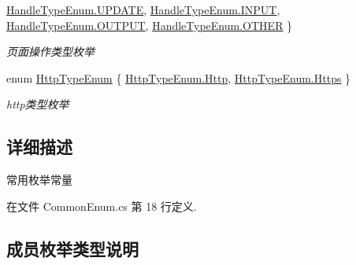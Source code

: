 \begin{DoxyCompactItemize}
\hyperlink{class_x_c_l_net_tools_1_1_enum_1_1_common_enum_af5501e481d93b082864bdcfb5fdb9596a15a8022d0ed9cd9c2a2e756822703eb4}{Handle\+Type\+Enum.\+U\+P\+D\+A\+TE}, 
\hyperlink{class_x_c_l_net_tools_1_1_enum_1_1_common_enum_af5501e481d93b082864bdcfb5fdb9596aa84cc046d48610b05c21fd3670d0c829}{Handle\+Type\+Enum.\+I\+N\+P\+UT}, 
\newline
\hyperlink{class_x_c_l_net_tools_1_1_enum_1_1_common_enum_af5501e481d93b082864bdcfb5fdb9596a50a87f0d71f7221582dad4bf507a0f34}{Handle\+Type\+Enum.\+O\+U\+T\+P\+UT}, 
\hyperlink{class_x_c_l_net_tools_1_1_enum_1_1_common_enum_af5501e481d93b082864bdcfb5fdb9596a03570470bad94692ce93e32700d2e1cb}{Handle\+Type\+Enum.\+O\+T\+H\+ER}
 \}\begin{DoxyCompactList}\small\item\em 页面操作类型枚举 \end{DoxyCompactList}
\item 
enum \hyperlink{class_x_c_l_net_tools_1_1_enum_1_1_common_enum_aa7bca8c23af97a1230156aaddace5bb7}{Http\+Type\+Enum} \{ \hyperlink{class_x_c_l_net_tools_1_1_enum_1_1_common_enum_aa7bca8c23af97a1230156aaddace5bb7a9d4d43de68f0b3555d5a5ef5dc05bb95}{Http\+Type\+Enum.\+Http}, 
\hyperlink{class_x_c_l_net_tools_1_1_enum_1_1_common_enum_aa7bca8c23af97a1230156aaddace5bb7a2badb7fa3e862298a650909d45c5066b}{Http\+Type\+Enum.\+Https}
 \}\begin{DoxyCompactList}\small\item\em http类型枚举 \end{DoxyCompactList}
\end{DoxyCompactItemize}


\subsection{详细描述}
常用枚举常量 



在文件 Common\+Enum.\+cs 第 18 行定义.



\subsection{成员枚举类型说明}
\mbox{\label{class_x_c_l_net_tools_1_1_enum_1_1_common_enum_abac0e863746b7fb8e6364c17f61648ea}} 
